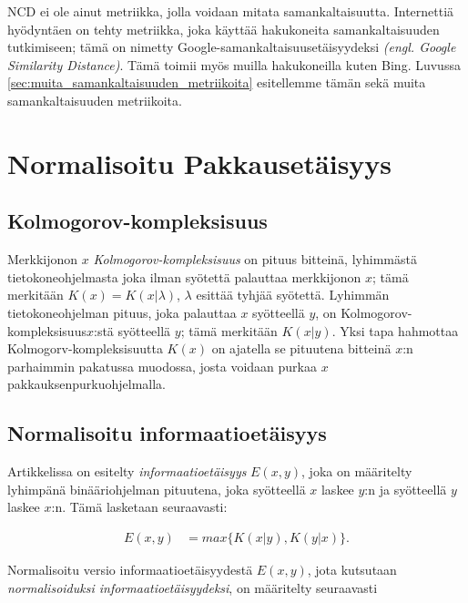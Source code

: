 \documentclass[12pt,finnish,draft]{tktltiki2}
\theoremstyle{definition}
\theoremstyle{remark}
\newcommand{\engl}[1]{\emph{(engl. #1)}}
\newcommand{\kolmogorov}{Kolmogorov-kompleksisuus}
\begin{document}
\label{par:intro-5}
  NCD ei ole ainut metriikka, jolla voidaan mitata samankaltaisuutta.
  Internettiä hyödyntäen on tehty metriikka, joka käyttää hakukoneita samankaltaisuuden tutkimiseen; tämä on nimetty Google-samankaltaisuusetäisyydeksi \engl{Google Similarity Distance}.
  Tämä toimii myös muilla hakukoneilla kuten Bing. Luvussa \ref{sec:muita_samankaltaisuuden_metriikoita} esitellemme tämän sekä muita samankaltaisuuden metriikoita.


\section{Normalisoitu Pakkausetäisyys} %
\label{sec:normalisoitu_pakkauset_isyys}
  \subsection{\kolmogorov} %
\label{sub:kolmogorov_kompleksisuus}

  Merkkijonon $x$ \emph{\kolmogorov} on pituus bitteinä, lyhimmästä tietokoneohjelmasta joka ilman syötettä palauttaa merkkijonon $x$; tämä merkitään $K(x)=K(x|\lambda)$, $\lambda$ esittää tyhjää syötettä.
  Lyhimmän tietokoneohjelman pituus, joka palauttaa $x$ syötteellä $y$, on \kolmogorov $x$:stä syötteellä $y$; tämä merkitään $K(x|y)$.
  Yksi tapa hahmottaa Kolmogorv-kompleksisuutta $K(x)$ on ajatella se pituutena bitteinä $x$:n parhaimmin pakatussa muodossa, josta voidaan purkaa $x$ pakkauksenpurkuohjelmalla.

\subsection{Normalisoitu informaatioetäisyys} %
\label{sub:normalisoitu_informaatioet_isyys}

  Artikkelissa \cite{CV05} on esitelty \emph{informaatioetäisyys} $E(x,y)$, joka on määritelty lyhimpänä binääriohjelman pituutena, joka syötteellä $x$ laskee $y$:n ja syötteellä $y$ laskee $x$:n. Tämä lasketaan seuraavasti:

  \begin{align}
    E(x,y) &= max\{K(x|y),K(y|x)\}.
  \end{align}

  Normalisoitu versio informaatioetäisyydestä $E(x,y)$, jota kutsutaan \emph{normalisoiduksi informaatioetäisyydeksi}, on määritelty seuraavasti
\end{document}

